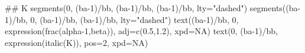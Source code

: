 \documentclass[
  11pt,
]{article}
\newenvironment{Shaded}{}{}
\newcommand{\AttributeTok}[1]{#1}
\newcommand{\ConstantTok}[1]{#1}
\newcommand{\DecValTok}[1]{#1}
\newcommand{\DocumentationTok}[1]{\textcolor[rgb]{0.00,0.50,0.00}{#1}}
\newcommand{\FloatTok}[1]{#1}
\newcommand{\FunctionTok}[1]{#1}
\newcommand{\NormalTok}[1]{#1}
\newcommand{\SpecialCharTok}[1]{\textcolor[rgb]{0.00,0.50,0.50}{#1}}
\newcommand{\StringTok}[1]{\textcolor[rgb]{0.00,0.50,0.50}{#1}}
\begin{document}
\begin{Shaded}
\begin{Highlighting}[]
\DocumentationTok{\#\# K}
\FunctionTok{segments}\NormalTok{(}\DecValTok{0}\NormalTok{, (ba}\DecValTok{{-}1}\NormalTok{)}\SpecialCharTok{/}\NormalTok{bb, (ba}\DecValTok{{-}1}\NormalTok{)}\SpecialCharTok{/}\NormalTok{bb, (ba}\DecValTok{{-}1}\NormalTok{)}\SpecialCharTok{/}\NormalTok{bb, }\AttributeTok{lty=}\StringTok{"dashed"}\NormalTok{)}
\FunctionTok{segments}\NormalTok{((ba}\DecValTok{{-}1}\NormalTok{)}\SpecialCharTok{/}\NormalTok{bb, }\DecValTok{0}\NormalTok{, (ba}\DecValTok{{-}1}\NormalTok{)}\SpecialCharTok{/}\NormalTok{bb, (ba}\DecValTok{{-}1}\NormalTok{)}\SpecialCharTok{/}\NormalTok{bb, }\AttributeTok{lty=}\StringTok{"dashed"}\NormalTok{)}
\FunctionTok{text}\NormalTok{((ba}\DecValTok{{-}1}\NormalTok{)}\SpecialCharTok{/}\NormalTok{bb, }\DecValTok{0}\NormalTok{, }\FunctionTok{expression}\NormalTok{(}\FunctionTok{frac}\NormalTok{(alpha}\DecValTok{{-}1}\NormalTok{,beta)), }\AttributeTok{adj=}\FunctionTok{c}\NormalTok{(}\FloatTok{0.5}\NormalTok{,}\FloatTok{1.2}\NormalTok{), }\AttributeTok{xpd=}\ConstantTok{NA}\NormalTok{)}
\FunctionTok{text}\NormalTok{(}\DecValTok{0}\NormalTok{, (ba}\DecValTok{{-}1}\NormalTok{)}\SpecialCharTok{/}\NormalTok{bb, }\FunctionTok{expression}\NormalTok{(}\FunctionTok{italic}\NormalTok{(K)), }\AttributeTok{pos=}\DecValTok{2}\NormalTok{, }\AttributeTok{xpd=}\ConstantTok{NA}\NormalTok{)}
\end{Highlighting}
\end{Shaded}
\end{document}
